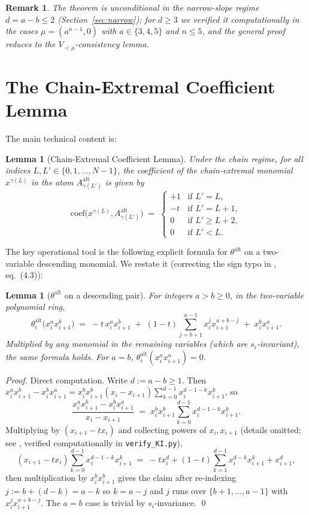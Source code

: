 \documentclass[11pt]{article}
\newtheorem{lemma}[theorem]{Lemma}
\newtheorem*{remark*}{Remark}
\newcommand{\Aalt}{A^{\mathrm{alt}}}
\newcommand{\thalt}{\theta^{\mathrm{alt}}}
\begin{document}
\begin{remark*}
The theorem is \emph{unconditional} in the narrow-slope regime $d = a - b \le 2$
(Section~\ref{sec:narrow}); for $d \ge 3$ we verified it computationally
in the cases $\mu = (a^{n-1}, 0)$ with $a \in \{3, 4, 5\}$ and $n \le 5$,
and the general proof reduces to the $V_{<\mu}$-consistency lemma.
\end{remark*}

\section{The Chain-Extremal Coefficient Lemma}\label{sec:extlemma}

The main technical content is:

\begin{lemma}[Chain-Extremal Coefficient Lemma]\label{lem:chainextr}
Under the chain regime, for all indices $L, L' \in \{0, 1, \ldots, N-1\}$,
the coefficient of the chain-extremal monomial $x^{\gamma(L)}$ in the atom
$\Aalt_{\gamma(L')}$ is given by
\[
  \mathrm{coef}\bigl(x^{\gamma(L)}, \Aalt_{\gamma(L')}\bigr)
  \;=\;
  \begin{cases}
    +1 & \text{if } L' = L,\\
    -t & \text{if } L' = L + 1,\\
    0  & \text{if } L' \ge L + 2,\\
    0  & \text{if } L' < L.
  \end{cases}
\]
\end{lemma}

The key operational tool is the following explicit formula for $\thalt$ on
a two-variable descending monomial.  We restate it (correcting the sign
typo in \cite{clio-0723}, eq.~(4.3)):

\begin{lemma}[$\thalt$ on a descending pair]\label{lem:thalt-desc}
For integers $a > b \ge 0$, in the two-variable polynomial ring,
\[
  \thalt_i\bigl(x_i^a x_{i+1}^b\bigr) \;=\;
  -t\, x_i^a x_{i+1}^b
  \;+\; (1-t) \sum_{j=b+1}^{a-1} x_i^j x_{i+1}^{a+b-j}
  \;+\; x_i^b x_{i+1}^a.
\]
Multiplied by any monomial in the remaining variables (which are $s_i$-invariant), the
same formula holds.  For $a = b$, $\thalt_i(x_i^a x_{i+1}^a) = 0$.
\end{lemma}

\begin{proof}
Direct computation.  Write $d := a - b \ge 1$.  Then
$x_i^a x_{i+1}^b - x_i^b x_{i+1}^a = x_i^b x_{i+1}^b (x_i - x_{i+1}) \sum_{k=0}^{d-1} x_i^{d-1-k} x_{i+1}^k$,
so
\[
  \frac{x_i^a x_{i+1}^b - x_i^b x_{i+1}^a}{x_i - x_{i+1}} \;=\; x_i^b x_{i+1}^b \sum_{k=0}^{d-1} x_i^{d-1-k} x_{i+1}^k.
\]
Multiplying by $(x_{i+1} - t x_i)$ and collecting powers of $x_i, x_{i+1}$ (details omitted; see
\cite{clio-0723-scratch}, verified computationally in \texttt{verify\_KI.py}),
\[
  (x_{i+1} - t x_i) \sum_{k=0}^{d-1} x_i^{d-1-k} x_{i+1}^k
  \;=\; -t x_i^d + (1-t) \sum_{k=1}^{d-1} x_i^{d-k} x_{i+1}^k + x_{i+1}^d,
\]
then multiplication by $x_i^b x_{i+1}^b$ gives the claim after re-indexing
$j := b + (d-k) = a - k$ so $k = a - j$ and $j$ runs over $\{b+1, \ldots, a-1\}$
with $x_i^j x_{i+1}^{a+b-j}$.
The $a = b$ case is trivial by $s_i$-invariance. \qed
\end{proof}
\end{document}
